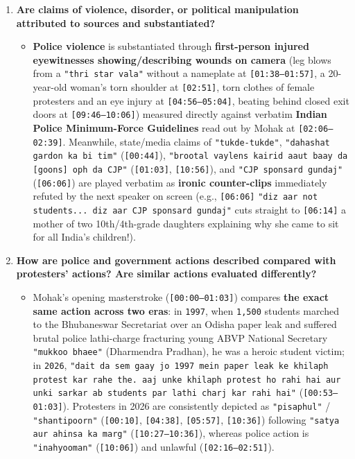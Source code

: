 \documentclass[10pt,a4paper]{article}
\begin{document}
\begin{enumerate}[leftmargin=1.6em, itemsep=4pt, topsep=4pt]
\begin{itemize}[leftmargin=1.4em, itemsep=2pt, topsep=2pt]
  \end{itemize}
  \item \textbf{Are claims of violence, disorder, or political manipulation attributed to sources and substantiated?}
  \begin{itemize}[leftmargin=1.4em, itemsep=2pt, topsep=2pt]
    \item \textbf{Police violence} is substantiated through \textbf{first-person injured eyewitnesses showing/describing wounds on camera} (leg blows from a \texttt{"thri star vala"} without a nameplate at \texttt{[01:38--01:57]}, a 20-year-old woman's torn shoulder at \texttt{[02:51]}, torn clothes of female protesters and an eye injury at \texttt{[04:56--05:04]}, beating behind closed exit doors at \texttt{[09:46--10:06]}) measured directly against verbatim \textbf{Indian Police Minimum-Force Guidelines} read out by Mohak at \texttt{[02:06--02:39]}. Meanwhile, state/media claims of \texttt{"tukde-tukde"}, \texttt{"dahashat gardon ka bi tim"} (\texttt{[00:44]}), \texttt{"brootal vaylens kairid aaut baay da [goons] oph da CJP"} (\texttt{[01:03]}, \texttt{[10:56]}), and \texttt{"CJP sponsard gundaj"} (\texttt{[06:06]}) are played verbatim as \textbf{ironic counter-clips} immediately refuted by the next speaker on screen (e.g., \texttt{[06:06]} \texttt{"diz aar not students... diz aar CJP sponsard gundaj"} cuts straight to \texttt{[06:14]} a mother of two 10th/4th-grade daughters explaining why she came to sit for all India's children!).
  \end{itemize}
  \item \textbf{How are police and government actions described compared with protesters' actions? Are similar actions evaluated differently?}
  \begin{itemize}[leftmargin=1.4em, itemsep=2pt, topsep=2pt]
    \item Mohak's opening masterstroke (\texttt{[00:00--01:03]}) compares \textbf{the exact same action across two eras}: in \texttt{1997}, when \texttt{1,500} students marched to the Bhubaneswar Secretariat over an Odisha paper leak and suffered brutal police lathi-charge fracturing young ABVP National Secretary \texttt{"mukkoo bhaee"} (Dharmendra Pradhan), he was a heroic student victim; in \texttt{2026}, \texttt{"dait da sem gaay jo 1997 mein paper leak ke khilaph protest kar rahe the. aaj unke khilaph protest ho rahi hai aur unki sarkar ab students par lathi charj kar rahi hai"} (\texttt{[00:53--01:03]}). Protesters in 2026 are consistently depicted as \texttt{"pisaphul"} / \texttt{"shantipoorn"} (\texttt{[00:10]}, \texttt{[04:38]}, \texttt{[05:57]}, \texttt{[10:36]}) following \texttt{"satya aur ahinsa ka marg"} (\texttt{[10:27--10:36]}), whereas police action is \texttt{"inahyooman"} (\texttt{[10:06]}) and unlawful (\texttt{[02:16--02:51]}).

\end{itemize}
\end{enumerate}
\end{document}
